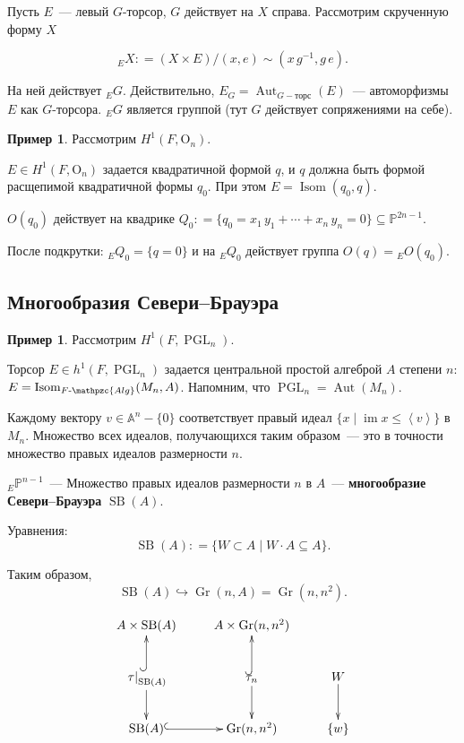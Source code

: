 \documentclass[a4paper]{article}
\DeclareMathOperator{\Gr}{Gr}
\DeclareMathOperator{\Aut}{Aut}
\DeclareMathOperator{\PGL}{PGL}
\DeclareMathOperator{\SB}{SB}
\DeclareMathOperator{\Isom}{Isom}
\DeclareMathOperator{\im}{im}
\newcommand{\categ}{\mathpzc}
\renewcommand{\O}{\mathrm{O}}
\newcommand{\term}{\textbf}
\newcommand{\dfn}{\mathrel{\mathop:}=}
\theoremstyle{definition}
\newtheorem{example}[theorem]{Пример}
\begin{document}
Пусть $E$~--- левый $G$-торсор, $G$ действует на $X$ справа.
Рассмотрим скрученную форму $X$

\[ {}_EX \dfn (X\times E)/ \! {(x,e) \sim (x\,g^{-1}, g\,e)}. \]

На ней действует ${}_EG$. Действительно,
${}E_G=\Aut_{G-\text{торс}}(E)$~--- автоморфизмы $E$ как
$G$-торсора. ${}_EG$ является группой (тут $G$ действует сопряжениями
на себе). 


\begin{example}
Рассмотрим $H^1 (F,\O_n)$.

$E \in H^1 (F,\O_n)$ задается квадратичной формой $q$, и $q$ должна
быть формой расщепимой квадратичной формы $q_0$. При этом $E = \Isom
(q_0, q)$.

$O (q_0)$ действует на квадрике $Q_0 \dfn \{ q_0 = x_1\,y_1 + \cdots +
x_n\,y_n = 0 \} \subseteq \mathbb{P}^{2n-1}$.

После подкрутки: ${}_EQ_0 = \{ q = 0 \}$ и на ${}_EQ_0$ действует
группа $O(q)={}_EO(q_0)$.
\end{example}

\subsection{Многообразия Севери--Брауэра}

\begin{example}
Рассмотрим $H^1 (F, \PGL_n)$.

Торсор $E\in h^1(F,\PGL_n)$ задается центральной простой алгеброй $A$
степени $n$:
$E = \Isom_{F\text{-}\categ{Alg}} (M_n, A)$. Напомним, что $\PGL_n=\Aut(M_n)$.


Каждому вектору $v \in \mathbb{A}^n - \{ 0 \}$ соответствует правый
идеал $\{x\mid \im x\leq \left<v\right>\}$ в $M_n$. Множество всех
идеалов, получающихся таким образом~--- это в точности множество
правых идеалов размерности $n$.


${}_E\mathbb{P}^{n-1}$~--- Множество правых идеалов размерности $n$ в
$A$~--- \term{многообразие Севери--Брауэра} $\SB (A)$.

Уравнения:
\[ \SB (A) \dfn \{ W \subset A \mid W\cdot A \subseteq A \}. \]

Таким образом,
\[ \SB (A) \hookrightarrow \Gr (n,A) = \Gr (n,n^2). \]

\[ \xymatrix{
A\times \SB(A) & A\times \Gr (n,n^2) \\
\left.\tau\right|_{\SB (A)}\ar[d]\ar@{^(->}[u] & \tau_n\ar[d]\ar@{^(->}[u] & W\ar[d] \\
\SB (A)\ar@{^(->}[r] & \Gr (n,n^2) & \{ w \}
} \]
\end{example}
\end{document}
